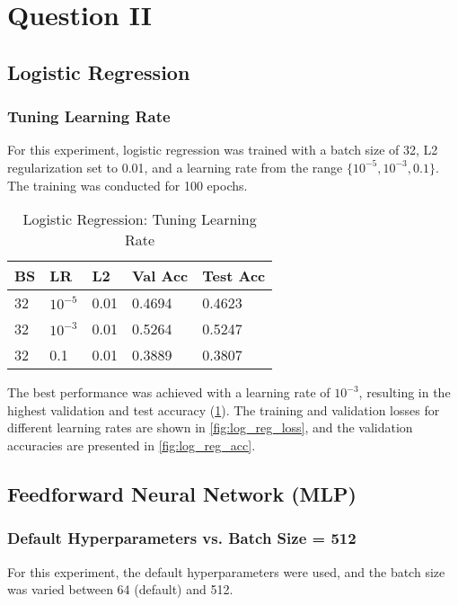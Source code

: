 \section{Question II}
\subsection{Logistic Regression}

\subsubsection{Tuning Learning Rate}
For this experiment, logistic regression was trained with a batch size of 32, L2 regularization set to 0.01, and a learning rate from the range $\{10^{-5}, 10^{-3}, 0.1\}$. The training was conducted for 100 epochs.

\begin{table}[h]
\centering
\caption{Logistic Regression: Tuning Learning Rate}
\label{tab:logistic_regression_lr}
\begin{tabularx}{\columnwidth}{|X|X|X|X|X|}
\hline
\textbf{BS} & \textbf{LR} & \textbf{L2} & \textbf{Val Acc} & \textbf{Test Acc} \\ \hline
 32 & $10^{-5}$ & 0.01 & 0.4694 & 0.4623 \\ \hline
 32 & $10^{-3}$ & 0.01 & 0.5264 & 0.5247 \\ \hline
 32 & 0.1 & 0.01 & 0.3889 & 0.3807 \\ \hline
\end{tabularx}
\end{table}

The best performance was achieved with a learning rate of $10^{-3}$, resulting in the highest validation and test accuracy (\cref{tab:logistic_regression_lr}). The training and validation losses for different learning rates are shown in \cref{fig:log_reg_loss}, and the validation accuracies are presented in \cref{fig:log_reg_acc}.

\subsection{Feedforward Neural Network (MLP)}

\subsubsection{Default Hyperparameters vs. Batch Size = 512}
For this experiment, the default hyperparameters were used, and the batch size was varied between 64 (default) and 512.

